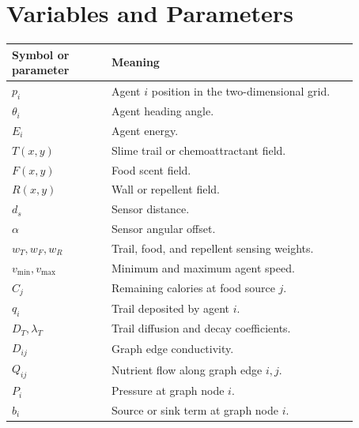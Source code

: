 \documentclass[11pt]{article}
\begin{document}
\section{Variables and Parameters}
\begin{center}
\begin{tabular}{>{\raggedright\arraybackslash}p{0.25\linewidth}
                >{\raggedright\arraybackslash}p{0.62\linewidth}}
\hline
Symbol or parameter & Meaning \\
\hline
$p_i$ & Agent $i$ position in the two-dimensional grid. \\
$\theta_i$ & Agent heading angle. \\
$E_i$ & Agent energy. \\
$T(x,y)$ & Slime trail or chemoattractant field. \\
$F(x,y)$ & Food scent field. \\
$R(x,y)$ & Wall or repellent field. \\
$d_s$ & Sensor distance. \\
$\alpha$ & Sensor angular offset. \\
$w_T,w_F,w_R$ & Trail, food, and repellent sensing weights. \\
$v_{\min},v_{\max}$ & Minimum and maximum agent speed. \\
$C_j$ & Remaining calories at food source $j$. \\
$q_i$ & Trail deposited by agent $i$. \\
$D_T,\lambda_T$ & Trail diffusion and decay coefficients. \\
$D_{ij}$ & Graph edge conductivity. \\
$Q_{ij}$ & Nutrient flow along graph edge $i,j$. \\
$P_i$ & Pressure at graph node $i$. \\
$b_i$ & Source or sink term at graph node $i$. \\
\hline
\end{tabular}
\end{center}
\end{document}

